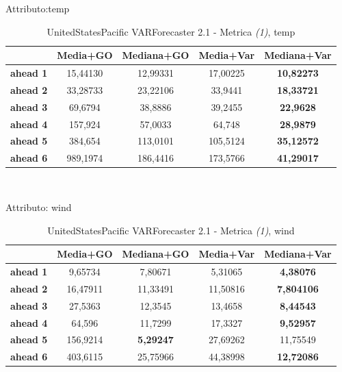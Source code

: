 \documentclass[12pt,a4paper,oneside,openright]{book}
\begin{document}
\medskip

Attributo:temp \\ 

\begin{table}[H]
\centering
\begin{tabular}{|c|c|c|c|c|}
\hline
 & \textbf{Media+GO} & \textbf{Mediana+GO} & \textbf{Media+Var} & \textbf{Mediana+Var} \\
\hline
\textbf{ahead 1} & 15,44130 & 12,99331 & 17,00225 & \textbf{10,82273} \\
\hline
\textbf{ahead 2} & 33,28733 & 23,22106 & 33,9441 & \textbf{18,33721} \\
\hline
\textbf{ahead 3} & 69,6794 & 38,8886 & 39,2455 & \textbf{22,9628} \\
\hline
\textbf{ahead 4} & 157,924 & 57,0033 & 64,748 & \textbf{28,9879} \\
\hline
\textbf{ahead 5} & 384,654 & 113,0101 & 105,5124 & \textbf{35,12572} \\
\hline
\textbf{ahead 6} & 989,1974 & 186,4416 & 173,5766 & \textbf{41,29017} \\
\hline
\end{tabular} \\
\caption{UnitedStatesPacific VARForecaster 2.1 - Metrica \textit{(1)}, temp}
\end{table}

\medskip

Attributo: wind \\ 

\begin{table}[H]
\centering
\begin{tabular}{|c|c|c|c|c|}
\hline
 & \textbf{Media+GO} & \textbf{Mediana+GO} & \textbf{Media+Var} & \textbf{Mediana+Var} \\
\hline
\textbf{ahead 1} & 9,65734 & 7,80671 & 5,31065 & \textbf{4,38076} \\
\hline
\textbf{ahead 2} & 16,47911 & 11,33491 & 11,50816 & \textbf{7,804106} \\
\hline
\textbf{ahead 3} & 27,5363 & 12,3545 & 13,4658 & \textbf{8,44543} \\
\hline
\textbf{ahead 4} & 64,596 & 11,7299 & 17,3327 & \textbf{9,52957} \\
\hline
\textbf{ahead 5} & 156,9214 & \textbf{5,29247} & 27,69262 & 11,75549 \\
\hline
\textbf{ahead 6} & 403,6115 & 25,75966 & 44,38998 & \textbf{12,72086} \\
\hline
\end{tabular}
\caption{UnitedStatesPacific VARForecaster 2.1 - Metrica \textit{(1)}, wind}
\end{table}
\newpage
\end{document}
